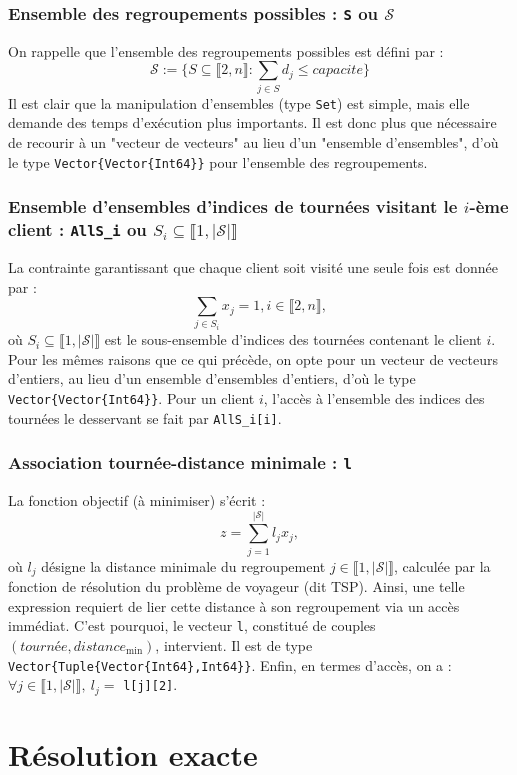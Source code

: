 \documentclass[french, 11pt, a4paper]{article} %
\newcommand{\Sc}{\mathcal{S}} %
\newcommand{\smb}{\smallbreak}
\begin{document}
\subsubsection{Ensemble des regroupements possibles : \texttt{S} ou $\Sc$}
On rappelle que l'ensemble des regroupements possibles est défini par :
\[\Sc := \Bigg\{ S \subseteq \llbracket 2,n \rrbracket : \sum_{j \in S} d_j \leq capacite \Bigg\} \]
Il est clair que la manipulation d'ensembles (type \verb+Set+) est simple, mais elle demande des temps d'exécution plus importants.
Il est donc plus que nécessaire de recourir à un "vecteur de vecteurs" au lieu d'un "ensemble d'ensembles", d'où
le type \verb+Vector{Vector{Int64}}+ pour l'ensemble des regroupements.

\subsubsection{Ensemble d'ensembles d'indices de tournées visitant le $i$-ème client : \texttt{AllS\_i} ou $S_i \subseteq \llbracket 1, |\Sc| \rrbracket$ }
La contrainte garantissant que chaque client soit visité une seule fois est donnée par :
\[ \sum_{j \in S_i} x_j = 1, i \in \llbracket 2,n \rrbracket, \]
où $S_i \subseteq \llbracket 1, |\Sc| \rrbracket$ est le sous-ensemble d'indices des tournées
contenant le client $i$.
Pour les mêmes raisons que ce qui précède, on opte pour un vecteur de vecteurs d'entiers, au lieu d'un ensemble d'ensembles d'entiers,
d'où le type \verb+Vector{Vector{Int64}}+.
\smb Pour un client $i$, l'accès à l'ensemble des indices des tournées le desservant se fait par \texttt{AllS\_i[i]}.

\subsubsection{Association tournée-distance minimale : \texttt{l}}
La fonction objectif (à minimiser) s'écrit :
\[ z = \sum_{j=1}^{|\Sc|} l_j x_j,\]
où $l_j$ désigne la distance minimale du regroupement $j \in \llbracket 1,|\Sc| \rrbracket$, calculée par la
fonction de résolution du problème de voyageur (dit TSP).
Ainsi, une telle expression requiert de lier cette distance à son regroupement via un accès immédiat.
C'est pourquoi, le vecteur \verb+l+, constitué de couples $(tourn \text{é} e,distance_{\text{min}})$, intervient.
Il est de type \verb+Vector{Tuple{Vector{Int64},Int64}}+.
\smb Enfin, en termes d'accès, on a : $\forall j \in \llbracket 1,|\Sc| \rrbracket, \: l_j = $ \texttt{l[j][2]}.


\section{Résolution exacte}
\end{document}
